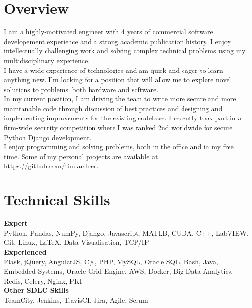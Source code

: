 
\section*{Overview}
I am a highly-motivated engineer with 4 years of commercial software developement experience and a strong academic publication history. I enjoy intellectually challenging work and solving complex technical problems using my multidisciplinary experience.\\[5pt]

I have a wide experience of technologies and am quick and eager to learn anything new. I'm looking for a position that will allow me to explore novel solutions to problems, both hardware and software.\\[5pt]

In my current position, I am driving the team to write more secure and more maintanable code through discussion of best practices and designing and implementing improvements for the existing codebase. I recently took part in a firm-wide security competition where I was ranked 2nd worldwide for secure Python Django development.\\[5pt]

I enjoy programming and solving problems, both in the office and in my free time. Some of my personal projects are available at \url{https://github.com/timlardner}.

\section*{Technical Skills}
\textbf{Expert}\\
Python, Pandas, NumPy, Django, Javascript, MATLB, CUDA, C++, LabVIEW, Git, Linux, LaTeX, Data Visualisation, TCP/IP\\[10pt]
\textbf{Experienced}\\
Flask, jQuery, AngularJS, C\#, PHP, MySQL, Oracle SQL, Bash, Java, Embedded Systems, Oracle Grid Engine, AWS, Docker, Big Data Analytics, Redis, Celery, Nginx, PKI\\[10pt]
\textbf{Other SDLC Skills}\\
TeamCity, Jenkins, TravisCI, Jira, Agile, Scrum\\[5pt] 